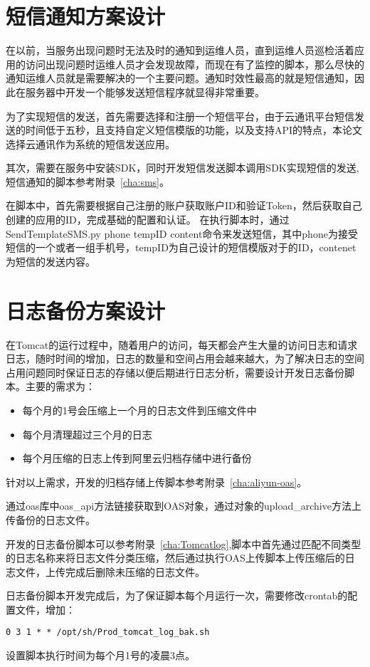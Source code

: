 \section{短信通知方案设计}

在以前，当服务出现问题时无法及时的通知到运维人员，直到运维人员巡检活着应用的访问出现问题时运维人员才会发现故障，而现在有了监控的脚本，那么尽快的通知运维人员就是需要解决的一个主要问题。通知时效性最高的就是短信通知，因此在服务器中开发一个能够发送短信程序就显得非常重要\cite{陈泰伟2007基于短信平台的服务器监控系统关键技术探讨}。

为了实现短信的发送，首先需要选择和注册一个短信平台，由于云通讯平台短信发送的时间低于五秒，且支持自定义短信模版的功能，以及支持API的特点，本论文选择云通讯作为系统的短信发送应用。

其次，需要在服务中安装SDK，同时开发短信发送脚本调用SDK实现短信的发送,短信通知的脚本参考附录~\ref{cha:sms}。

在脚本中，首先需要根据自己注册的账户获取账户ID和验证Token，然后获取自己创建的应用的ID，完成基础的配置和认证。
在执行脚本时，通过SendTemplateSMS.py phone tempID content命令来发送短信，其中phone为接受短信的一个或者一组手机号，tempID为自己设计的短信模版对于的ID，contenet为短信的发送内容。

\section{日志备份方案设计}

在Tomcat的运行过程中，随着用户的访问，每天都会产生大量的访问日志和请求日志，随时时间的增加，日志的数量和空间占用会越来越大，为了解决日志的空间占用问题同时保证日志的存储以便后期进行日志分析，需要设计开发日志备份脚本。主要的需求为：
\begin{itemize}
\item 每个月的1号会压缩上一个月的日志文件到压缩文件中
\item 每个月清理超过三个月的日志
\item 每个月压缩的日志上传到阿里云归档存储中进行备份
\end{itemize}
针对以上需求，开发的归档存储上传脚本参考附录~\ref{cha:aliyun-oas}。

通过oas库中oas\_api方法链接获取到OAS对象，通过对象的upload\_archive方法上传备份的日志文件。

开发的日志备份脚本可以参考附录~\ref{cha:Tomcatlog},脚本中首先通过匹配不同类型的日志名称来将日志文件分类压缩，然后通过执行OAS上传脚本上传压缩后的日志文件，上传完成后删除未压缩的日志文件。

日志备份脚本开发完成后，为了保证脚本每个月运行一次，需要修改crontab的配置文件，增加：
\begin{lstlisting}[numbers=none]
0 3 1 * * /opt/sh/Prod_tomcat_log_bak.sh
\end{lstlisting}
设置脚本执行时间为每个月1号的凌晨3点。
\label{cha:Monitor-aliyun}
